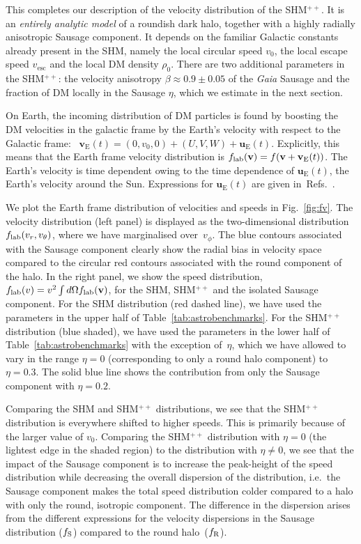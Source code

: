 \documentclass[prd,10pt,twocolumn,showpacs,nofootinbib, aps,superscriptaddress,preprintnumbers]{revtex4-1}
\newcommand{\vesc}{v_\mathrm{esc}}
\newcommand{\fR}{f_{\rm R}}
\newcommand{\fS}{f_{\rm S}}
\begin{document}
This completes our description of the velocity distribution of the
SHM$^{++}$. It is an {\it entirely analytic model} of a roundish dark
halo, together with a highly radially anisotropic Sausage
component. It depends on the familiar Galactic constants already
present in the SHM, namely the local circular speed $v_0$, the local
escape speed $\vesc$ and the local DM density $\rho_0$. There are two
additional parameters in the SHM$^{++}$:  the velocity
anisotropy $\beta \approx 0.9 \pm 0.05$ of the \emph{Gaia} Sausage
and the fraction of DM locally in the Sausage $\eta$, which
we estimate in the next section.

On Earth, the incoming distribution of DM particles is found by boosting
the DM velocities in the galactic frame by the Earth's 
velocity with respect
to the Galactic frame: ~$\mathbf{v}_{\mathrm{E}}(t)=(0,v_0,0)+(U,V,W)+\mathbf{u}_{\mathrm{E}}(t)$.
Explicitly, this means that the Earth frame velocity distribution is
$f_{\rm{lab}}(\mathbf{v})=f(\mathbf{v}+\mathbf{v}_{\mathrm{E}}(t))$.
The Earth's velocity is time dependent
owing to the time dependence of $\mathbf{u}_{\mathrm{E}}(t)$,
the Earth's velocity around the Sun.  Expressions for
$\mathbf{u}_{\mathrm{E}}(t)$ are given in~Refs.~\cite{Lee:2013xxa,
  McCabe:2013kea,Mayet:2016zxu}.
  
We plot the Earth frame distribution of
velocities and speeds in Fig.~\ref{fig:fv}.
The velocity distribution (left panel) is
displayed as the two-dimensional distribution $f_{\rm{lab}}(v_r,v_\theta)$,
 where we have marginalised over~$v_\phi$. 
 The blue contours associated with the Sausage component clearly show the
 radial bias in velocity space compared to the circular
 red contours associated with the round component of the halo.
In the right panel, we show the speed distribution,
$f_{\rm{lab}}(v)=v^2 \int d \Omega f_{\rm{lab}}(\mathbf{v})$,
for the SHM, SHM$^{++}$ and the isolated Sausage component.
For the SHM distribution (red dashed line), we have used the
parameters in the upper half of Table~\ref{tab:astrobenchmarks}.
For the SHM$^{++}$ distribution (blue shaded), we have used the parameters in
the lower half of Table~\ref{tab:astrobenchmarks} with the exception of~$\eta$, which
we have allowed to vary in the range $\eta=0$ 
(corresponding to only a round halo component)
to $\eta=0.3$. The solid blue line shows the contribution from only the Sausage
component with $\eta=0.2$.

Comparing the SHM and SHM$^{++}$ distributions, we see that the
SHM$^{++}$ distribution is everywhere shifted to higher speeds. This
is primarily because of the larger value of $v_0$.  Comparing the
SHM$^{++}$ distribution with $\eta=0$ (the lightest edge in the shaded
region) to the distribution with $\eta\neq0$, we see that the impact
of the Sausage component is to increase the peak-height of the speed
distribution while decreasing the overall dispersion of the
distribution, i.e.\ the Sausage component makes the total speed
distribution colder compared to a halo with only the round, isotropic
component.  The difference in the dispersion arises from the different
expressions for the velocity dispersions in the Sausage distribution
($\fS$) compared to the round halo~($\fR$).
\end{document}
